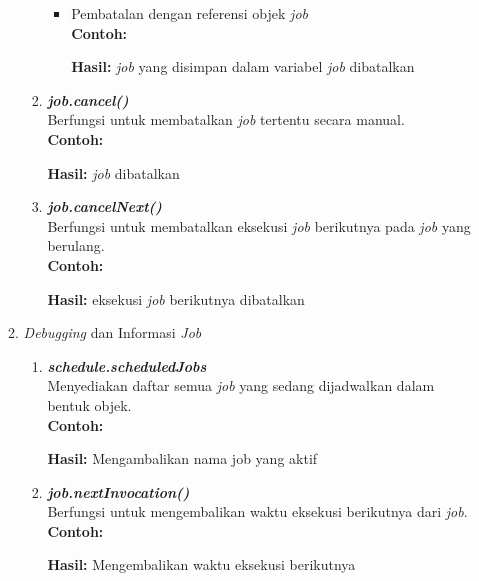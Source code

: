 \begin{enumerate}[label*=\arabic*.,ref=\arabic*]
\begin{enumerate}[label*=\arabic*.,ref=\arabic*]
\begin{enumerate}[label=\alph*.]
\begin{itemize}
                \item Pembatalan dengan referensi objek \textit{job}\\
                \textbf{Contoh:}
                \vspace{-0.1cm}
                
                \textbf{Hasil:} \textit{job} yang disimpan dalam variabel \textit{job} dibatalkan

            \end{itemize}
                
            \item \textbf{\textit{job.cancel()}}\\
            Berfungsi untuk membatalkan \textit{job} tertentu secara manual.\\
            \textbf{Contoh:}
            \vspace{-0.1cm}
            
            \textbf{Hasil:} \textit{job} dibatalkan
            
            \item \textbf{\textit{job.cancelNext()}}\\
            Berfungsi untuk membatalkan eksekusi \textit{job} berikutnya pada \textit{job} yang berulang.\\
            \textbf{Contoh:}
            \vspace{-0.1cm}
            
            \textbf{Hasil:} eksekusi \textit{job} berikutnya dibatalkan
                
        \end{enumerate}

        \item \textit{Debugging} dan Informasi \textit{Job}\\
        \begin{enumerate}[label=\alph*.]
            \item \textbf{\textit{schedule.scheduledJobs}}\\
            Menyediakan daftar semua \textit{job} yang sedang dijadwalkan dalam bentuk objek.\\
            \textbf{Contoh:}
            
            \textbf{Hasil:} Mengambalikan nama job yang aktif
                
            \item \textbf{\textit{job.nextInvocation()}}\\
            Berfungsi untuk mengembalikan waktu eksekusi berikutnya dari \textit{job}.\\
            \textbf{Contoh:}
            
            \textbf{Hasil:} Mengembalikan waktu eksekusi berikutnya 
                

\end{enumerate}
\end{enumerate}
\end{enumerate}
